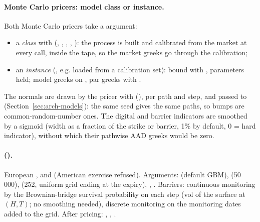 \paragraph{Monte Carlo pricers: model class or instance.} Both Monte Carlo pricers take a  argument:
\begin{itemize}[nosep]
  \item a \emph{class} with  (, ,
        , , ): the process is built and
        calibrated from the market at every call, inside the tape, so the market greeks go through the calibration;
  \item an \emph{instance} (, e.g. loaded from a calibration set): bound with
        , parameters held; model greeks on , par greeks
        with .
\end{itemize}
The normals are drawn by the pricer with  (),
 per path and step, and passed to  (Section~\ref{sec:arch-models}): the same
seed gives the same paths, so bumps are common-random-number ones. The digital and barrier indicators are smoothed by
a sigmoid (width as a fraction of the strike or barrier, 1\% by default, 0 = hard indicator), without which their
pathwise AAD greeks would be zero.

\paragraph{ ().} European ,  and
 (American exercise refused). Arguments:  (default GBM),  (50\,000),
 (252, uniform grid ending at the expiry), , . Barriers: continuous
monitoring by the Brownian-bridge survival probability on each step (vol of the surface at $(H, T)$; no smoothing
needed), discrete monitoring on the monitoring dates added to the grid. After pricing: ,
, .

